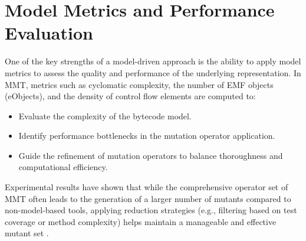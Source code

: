 \documentclass[sigplan, nonacm]{acmart}
\begin{document}
\section{Model Metrics and Performance Evaluation}
\label{sec:metrics}
One of the key strengths of a model-driven approach is the ability to apply model metrics to assess the quality and performance of the underlying representation. In MMT, metrics such as cyclomatic complexity, the number of EMF objects (eObjects), and the density of control flow elements are computed to:
\begin{itemize}[noitemsep]
    \item Evaluate the complexity of the bytecode model.
    \item Identify performance bottlenecks in the mutation operator application.
    \item Guide the refinement of mutation operators to balance thoroughness and computational efficiency.
\end{itemize}
Experimental results have shown that while the comprehensive operator set of MMT often leads to the generation of a larger number of mutants compared to non-model-based tools, applying reduction strategies (e.g., filtering based on test coverage or method complexity) helps maintain a manageable and effective mutant set \cite{Bockisch2024demonstration}.
\end{document}
